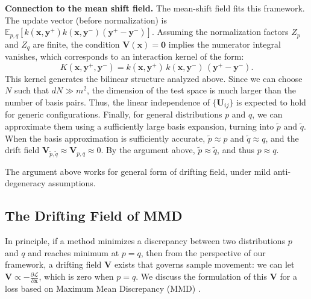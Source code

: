 \documentclass{article}
\newcommand{\vv}[1]{\mathbf{#1}}
\newcommand{\x}{\vv{x}}
\newcommand{\V}{\vv{V}}
\renewcommand{\paragraph}[1]{\vspace{.05em}\noindent\textbf{#1}}
\theoremstyle{plain}
\theoremstyle{definition}
\theoremstyle{remark}
\begin{document}
\paragraph{Connection to the mean shift field.}
The mean-shift field fits this framework.
The update vector (before normalization) is
$\mathbb{E}_{p,q}[ k(\mathbf{x},\mathbf{y}^+) k(\mathbf{x},\mathbf{y}^-) (\mathbf{y}^+ - \mathbf{y}^-) ]$.
Assuming the normalization factors $Z_p$ and $Z_q$ are finite, the condition $\mathbf{V}(\mathbf{x}) = \mathbf{0}$ implies the numerator integral vanishes, which corresponds to an interaction kernel of the form:
\begin{equation}
K(\mathbf{x}, \mathbf{y}^+, \mathbf{y}^-) = k(\mathbf{x},\mathbf{y}^+)\, k(\mathbf{x},\mathbf{y}^-)\, (\mathbf{y}^+ - \mathbf{y}^-).
\end{equation}
This kernel generates the bilinear structure analyzed above.
Since we can choose $N$ such that $dN \gg m^2$, the dimension of the test space is much larger than the number of basis pairs. Thus, the linear independence of $\{\mathbf{U}_{ij}\}$ is expected to hold for generic configurations.
Finally, for general distributions $p$ and $q$, we can approximate them using a sufficiently large basis expansion, turning into $\tilde p$ and $\tilde q$. When the basis approximation is sufficiently accurate, $\tilde p \approx p$ and $\tilde q \approx q$, and the drift field $\mathbf{V}_{\tilde p, \tilde q}\approx \mathbf{V}_{p,q}\approx 0$. By the argument above, $\tilde p\approx \tilde q$, and thus $p\approx q$.


The argument above works for general form of drifting field, under mild anti-degeneracy assumptions.


\subsection{The Drifting Field of MMD}
\label{sec:theory_mmd_relation}

In principle, if a method minimizes a discrepancy between two distributions $p$ and $q$ and reaches minimum at $p=q$, then from the perspective of our framework, a drifting field $\V$ exists that governs sample movement: we can let $\V{\propto}{-}\frac{\partial\mathcal L }{\partial {\x}}$, which is zero when $p=q$.
We discuss the formulation of this $\V$ for a loss based on Maximum Mean Discrepancy (MMD) \cite{li2015generative,dziugaite2015training}.

\newcommand{\kkk}{\tilde{k}}
\end{document}
